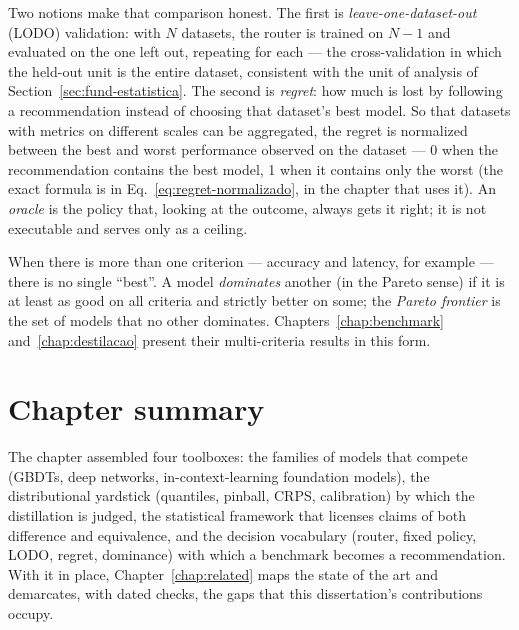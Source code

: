 Two notions make that comparison honest. The first is
\emph{leave-one-dataset-out} (LODO) validation: with $N$ datasets,
the router is trained on $N-1$ and evaluated on the one left out,
repeating for each --- the cross-validation in which the held-out
unit is the entire dataset, consistent with the unit of analysis of
Section~\ref{sec:fund-estatistica}. The second is \emph{regret}:
how much is lost by following a recommendation instead of choosing
that dataset's best model. So that datasets with metrics on
different scales can be aggregated, the regret is normalized
between the best and worst performance observed on the dataset ---
0 when the recommendation contains the best model, 1 when it
contains only the worst (the exact formula is in
Eq.~\ref{eq:regret-normalizado}, in the chapter that uses it). An
\emph{oracle} is the policy that, looking at the outcome, always
gets it right; it is not executable and serves only as a ceiling.

When there is more than one criterion --- accuracy and latency, for
example --- there is no single ``best''. A model \emph{dominates}
another (in the Pareto sense) if it is at least as good on all
criteria and strictly better on some; the \emph{Pareto frontier} is
the set of models that no other dominates.
Chapters~\ref{chap:benchmark} and~\ref{chap:destilacao} present
their multi-criteria results in this form.

\section{Chapter summary}

The chapter assembled four toolboxes: the families of models that
compete (GBDTs, deep networks, in-context-learning foundation
models), the distributional yardstick (quantiles, pinball, CRPS,
calibration) by which the distillation is judged, the statistical
framework that licenses claims of both difference and
equivalence, and the decision vocabulary (router, fixed policy,
LODO, regret, dominance) with which a benchmark becomes a
recommendation. With it in place, Chapter~\ref{chap:related} maps
the state of the art and demarcates, with dated checks, the gaps
that this dissertation's contributions occupy.
